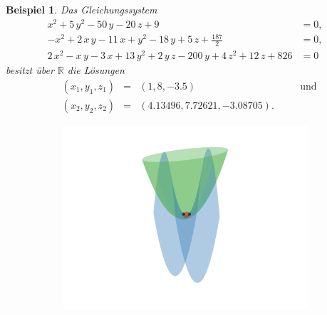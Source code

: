 \documentclass[a4paper,oneside, 11pt, openany%
]{article}
\newcommand{\R}{{\mathbb R}}
\theoremstyle{custom}
\theoremstyle{custom}
\newtheorem{example}{Beispiel}[section]
\begin{document}
	\begin{example}
		Das Gleichungssystem
		\begin{equation*}\label{eqn:example3}
			\begin{alignedat}{-1}
				x^2+5\,y^2-50\,y-20\,z+9&=0,\\
				 -x^2+2\,x\,y-11\,x+y^2-18\,y+5\,z+\frac{187}{2}&=0,\\ 2\,x^2-x\,y-3\,x+13\,y^2+2\,y\,z-200\,y+4\,z^2+12\,z+826&=0
			\end{alignedat}
		\end{equation*}
		besitzt über $\R$ die Lösungen
		\begin{equation*}
			\begin{alignedat}{5}
				&\left( x_{1},y_{1},z_{1}\right) &=& \left(1,8,-3.5 \right)&& \quad\text{und} \\
				&\left( x_{2},y_{2},z_{2}\right) &=& \left(4.13496,7.72621,-3.08705 \right).&&
			\end{alignedat}
		\end{equation*}
		\begin{figure}[H]
			\centering
			\begin{subfigure}[b]{0.8\textwidth}
				\includegraphics[width=\textwidth]{"images/e3q3_example2.png"}
			\end{subfigure}
			\begin{subfigure}[b]{0.8\textwidth}

\end{subfigure}
\end{figure}
\end{example}
\end{document}
